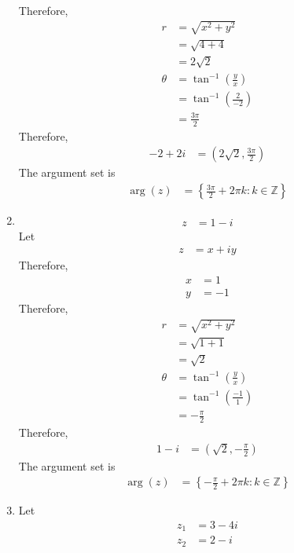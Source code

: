 \documentclass[fleqn, a4paper, 11pt, oneside]{amsart}
\theoremstyle{definition}
\theoremstyle{theorem}
\begin{document}
\begin{solution}
\begin{enumerate}[leftmargin=*]
\begin{align*}
			\end{align*}
			Therefore,
			\begin{align*}
				r &= \sqrt{x^2 + y^2}\\
				&= \sqrt{4 + 4}\\
				&= 2 \sqrt{2}\\
				\theta &= \tan^{-1}\left( \frac{y}{x} \right)\\
				&= \tan^{-1}\left( \frac{2}{-2} \right)\\
				&= \frac{3 \pi}{2}
			\end{align*}
			Therefore,
			\begin{align*}
				-2 + 2 i &= \left( 2 \sqrt{2} , \frac{3 \pi}{2} \right)
			\end{align*}
			The argument set is
			\begin{align*}
				\arg(z) &= \left\{ \frac{3 \pi}{2} + 2 \pi k : k \in \mathbb{Z} \right\}
			\end{align*}
		\item
			\begin{align*}
				z &= 1 - i
			\end{align*}
			Let
			\begin{align*}
				z &= x + i y
			\end{align*}
			Therefore,
			\begin{align*}
				x &= 1\\
				y &= -1
			\end{align*}
			Therefore,
			\begin{align*}
				r &= \sqrt{x^2 + y^2}\\
				&= \sqrt{1 + 1}\\
				&= \sqrt{2}\\
				\theta &= \tan^{-1}\left( \frac{y}{x} \right)\\
				&= \tan^{-1}\left( \frac{-1}{1} \right)\\
				&= -\frac{\pi}{2}
			\end{align*}
			Therefore,
			\begin{align*}
				1 - i &= \left( \sqrt{2} , -\frac{\pi}{2} \right)
			\end{align*}
			The argument set is
			\begin{align*}
				\arg(z) &= \left\{ -\frac{\pi}{2} + 2 \pi k : k \in \mathbb{Z} \right\}
			\end{align*}
		\item
			Let
			\begin{align*}
				z_1 &= 3 - 4 i\\
				z_2 &= 2 - i
			\end{align*}

\end{enumerate}
\end{solution}
\end{document}
